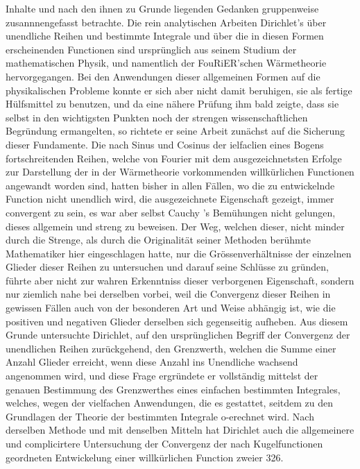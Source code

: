 \documentclass[11pt]{article}
\begin{document}
\noindent Inhalte und nach den ihnen zu Grunde liegenden Gedanken gruppenweise zusannnengefasst betrachte. Die rein analytischen Arbeiten Dirichlet’s über unendliche Reihen und bestimmte Integrale und über die in diesen Formen erscheinenden Functionen sind ursprünglich aus seinem Studium der mathematischen Physik, und namentlich der FouRiER’schen Wärmetheorie hervorgegangen. Bei den Anwendungen dieser allgemeinen Formen auf die physikalischen Probleme konnte er sich aber nicht damit beruhigen, sie als fertige Hülfsmittel zu benutzen, und da eine nähere Prüfung ihm bald zeigte, dass sie selbst in den wichtigsten Punkten noch der strengen wissenschaftlichen Begründung ermangelten, so richtete er seine Arbeit zunächst auf die Sicherung dieser Fundamente. Die nach Sinus und Cosinus der   ielfaclien eines Bogens fortschreitenden Reihen, welche von Fourier mit dem ausgezeichnetsten Erfolge zur Darstellung der in der Wärmetheorie vorkommenden willkürlichen Functionen angewandt worden sind, hatten bisher in allen Fällen, wo die zu entwickelnde Function nicht unendlich wird, die ausgezeichnete Eigenschaft gezeigt, immer convergent zu sein, es war aber selbst Cauchy ’s Bemühungen nicht gelungen, dieses allgemein und streng zu beweisen. Der Weg, welchen dieser, nicht minder durch die Strenge, als durch die Originalität seiner Methoden berühmte Mathematiker hier eingeschlagen hatte, nur die Grössenverhältnisse der einzelnen Glieder dieser Reihen zu untersuchen und darauf seine Schlüsse zu gründen, führte aber nicht zur wahren Erkenntniss dieser verborgenen Eigenschaft, sondern nur ziemlich nahe bei derselben vorbei, weil die Convergenz dieser Reihen in gewissen Fällen auch von der besonderen Art und Weise abhängig ist, wie die positiven und negativen Glieder derselben sich gegenseitig aufheben. Aus diesem Grunde untersuchte Dirichlet, auf den ursprünglichen Begriff der Convergenz der unendlichen Reihen zurückgehend, den Grenzwerth, welchen die Summe einer Anzahl Glieder erreicht, wenn diese Anzahl ins Unendliche wachsend angenommen wird, und diese Frage ergründete er vollständig mittelst der genauen Bestimmung des Grenzwerthes eines einfachen bestimmten Integrales, welches, wegen der vielfachen Anwendungen, die es gestattet, seitdem zu den Grundlagen der Theorie der bestimmten Integrale o-erechnet wird. Nach derselben Methode und mit denselben Mitteln hat Dirichlet auch die allgemeinere und complicirtere Untersuchung der Convergenz der nach Kugelfunctionen geordneten Entwickelung einer willkürlichen Function zweier 326. 
\par
\end{document}
